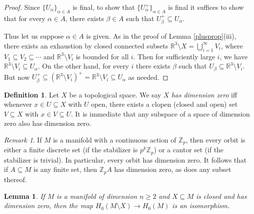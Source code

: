 \documentclass[12pt]{article}
\theoremstyle{plain}
\newtheorem{lemma}[theorem]{Lemma}
\theoremstyle{definition}
\newtheorem{definition}[theorem]{Definition}
\theoremstyle{remark}
\newtheorem{remark}[theorem]{Remark}
\numberwithin{equation}{section}
\begin{document}
\begin{proof}
Since $\{U_\alpha\}_{\alpha\in A}$ is final, to show that $\{U_\alpha^+\}_{\alpha\in A}$ is final it suffices to show that for every $\alpha\in A$, there exists $\beta\in A$ such that $U_\beta^+\subseteq U_\alpha$.

Thus let us suppose $\alpha\in A$ is given.  As in the proof of Lemma \ref{plusprop}(iii), there exists an exhaustion by closed connected subsets $\mathbb R^3\setminus X=\bigcup_{i=1}^\infty V_i$, where $V_1\subseteq V_2\subseteq\cdots$ and $\mathbb R^3\setminus V_i$ is bounded for all $i$.  Then for sufficiently large $i$, we have $\mathbb R^3\setminus V_i\subseteq U_\alpha$.  On the other hand, for every $i$ there exists $\beta$ such that $U_\beta\subseteq\mathbb R^3\setminus V_i$.  But now $U_\beta^+\subseteq(\mathbb R^3\setminus V_i)^+=\mathbb R^3\setminus V_i\subseteq U_\alpha$ as needed.
\end{proof}

\begin{definition}
Let $X$ be a topological space.  We say $X$ \emph{has dimension zero} iff whenever $x\in U\subseteq X$ with $U$ open, there exists a clopen (closed and open) set $V\subseteq X$ with $x\in V\subseteq U$.  It is immediate that any subspace of a space of dimension zero also has dimension zero.
\end{definition}

\begin{remark}\label{orbithasdimzero}
If $M$ is a manifold with a continuous action of $\mathbb Z_p$, then every orbit is either a finite discrete set (if the stabilizer is $p^k\mathbb Z_p$) or a cantor set (if the stabilizer is trivial).  In particular, every orbit has dimension zero.  It follows that if $A\subseteq M$ is any finite set, then $\mathbb Z_pA$ has dimension zero, as does any subset thereof.
\end{remark}

\begin{lemma}\label{nodisconnect}
If $M$ is a manifold of dimension $n\geq 2$ and $X\subseteq M$ is closed and has dimension zero, then the map $H_0(M\setminus X)\to H_0(M)$ is an isomorphism.
\end{lemma}
\end{document}

